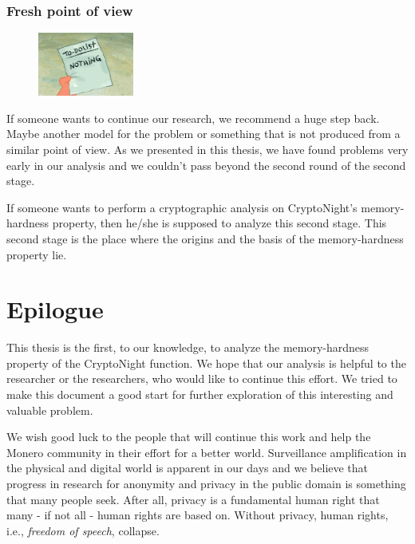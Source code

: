 \subsubsection{Fresh point of view}
\begin{figure}
\centering
\includegraphics[width=0.28\textwidth]{Images/Summary/nothing.jpg}
\end{figure}
If someone wants to continue our research, we recommend a huge step back. Maybe another model for the problem or something that is not produced from a similar point of view. As we presented in this thesis, we have found problems very early in our analysis and we couldn't pass beyond the second round of the second stage.

If someone wants to perform a cryptographic analysis on CryptoNight's memory-hardness property, then he/she is supposed to analyze this second stage. This second stage is the place where the origins and the basis of the memory-hardness property lie.
\clearpage
\pagebreak

\section{Epilogue}
This thesis is the first, to our knowledge, to analyze the memory-hardness property of the CryptoNight function. We hope that our analysis is helpful to the researcher or the researchers, who would like to continue this effort. We tried to make this document a good start for further exploration of this interesting and valuable problem.

We wish good luck to the people that will continue this work and help the Monero community in their effort for a better world. Surveillance amplification in the physical and digital world is apparent in our days and we believe that progress in research for anonymity and privacy in the public domain is something that many people seek. After all, privacy is a fundamental human right that many - if not all - human rights are based on. Without privacy, human rights, i.e., \emph{freedom of speech}, collapse.
